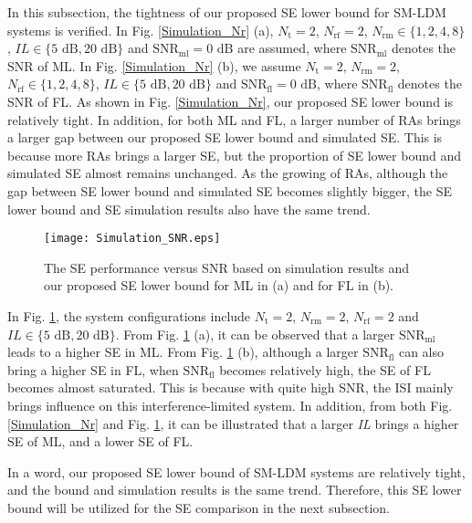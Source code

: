 \documentclass[journal]{IEEEtran}
\begin{document}
In this subsection, the tightness of our proposed SE lower bound for SM-LDM systems is verified. In Fig. \ref{Simulation_Nr} (a), $N_\text{t} = 2$, $N_\text{rf} = 2$, $N_\text{rm} \in \{1,2,4,8\}$, $\textit{IL} \in \{5 \text{ dB}, 20 \text{ dB}\}$ and $\text{SNR}_\text{ml} = 0 \text{ dB}$ are assumed, where $\text{SNR}_\text{ml}$ denotes the SNR of ML. In Fig. \ref{Simulation_Nr} (b), we assume $N_\text{t} = 2$, $N_\text{rm} = 2$, $N_\text{rf} \in \{1,2,4,8\}$, $\textit{IL} \in \{5 \text{ dB}, 20 \text{ dB}\}$ and $\text{SNR}_\text{fl} = 0 \text{ dB}$, where $\text{SNR}_\text{fl}$ denotes the SNR of FL. As shown in Fig. \ref{Simulation_Nr}, our proposed SE lower bound is relatively tight. In addition, for both ML and FL, a larger number of RAs brings a larger gap between our proposed SE lower bound and simulated SE. This is because more RAs brings a larger SE, but the proportion of SE lower bound and simulated SE almost remains unchanged. As the growing of RAs, although the gap between SE lower bound and simulated SE becomes slightly bigger, the SE lower bound and SE simulation results also have the same trend.

\begin{figure}
  \centering
  \texttt{[image: Simulation\_SNR.eps]}
  \caption{The SE performance versus SNR based on simulation results and our proposed SE lower bound for ML in (a) and for FL in (b).}\label{Simulation_SNR}
\end{figure}

In Fig. \ref{Simulation_SNR}, the system configurations include $N_\text{t} = 2$, $N_\text{rm} = 2$, $N_\text{rf} = 2$ and $\textit{IL} \in \{5 \text{ dB}, 20 \text{ dB}\}$. From Fig. \ref{Simulation_SNR} (a), it can be observed that a larger $\text{SNR}_\text{ml}$ leads to a higher SE in ML. From Fig. \ref{Simulation_SNR} (b), although a larger $\text{SNR}_\text{fl}$ can also bring a higher SE in FL, when $\text{SNR}_\text{fl}$ becomes relatively high, the SE of FL becomes almost saturated. This is because with quite high SNR, the ISI mainly brings influence on this interference-limited system. In addition, from both Fig. \ref{Simulation_Nr} and Fig. \ref{Simulation_SNR}, it can be illustrated that a larger \textit{IL} brings a higher SE of ML, and a lower SE of FL.

In a word, our proposed SE lower bound of SM-LDM systems are relatively tight, and the bound and simulation results is the same trend. Therefore, this SE lower bound will be utilized for the SE comparison in the next subsection.
\end{document}
